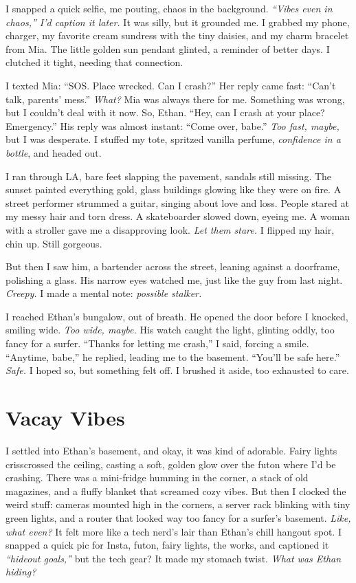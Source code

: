 \documentclass[12pt]{article}
\begin{document}
I snapped a quick selfie, me pouting, chaos in the background. \textit{“Vibes even in chaos,” I’d caption it later.} It was silly, but it grounded me. I grabbed my phone, charger, my favorite cream sundress with the tiny daisies, and my charm bracelet from \textnormal{Mia}. The little golden sun pendant glinted, a reminder of better days. I clutched it tight, needing that connection.

I texted \textnormal{Mia}: “SOS. Place wrecked. Can I crash?” Her reply came fast: “Can’t talk, parents’ mess.” \textit{What?} \textnormal{Mia} was always there for me. Something was wrong, but I couldn’t deal with it now. So, \textnormal{Ethan}. “Hey, can I crash at your place? Emergency.” His reply was almost instant: “Come over, babe.” \textit{Too fast, maybe,} but I was desperate. I stuffed my tote, spritzed vanilla perfume, \textit{confidence in a bottle}, and headed out.

I ran through LA, bare feet slapping the pavement, sandals still missing. The sunset painted everything gold, glass buildings glowing like they were on fire. A street performer strummed a guitar, singing about love and loss. People stared at my messy hair and torn dress. A skateboarder slowed down, eyeing me. A woman with a stroller gave me a disapproving look. \textit{Let them stare.} I flipped my hair, chin up. Still gorgeous.

But then I saw him, a bartender across the street, leaning against a doorframe, polishing a glass. His narrow eyes watched me, just like the guy from last night. \textit{Creepy.} I made a mental note: \textit{possible stalker.}

I reached \textnormal{Ethan}’s bungalow, out of breath. He opened the door before I knocked, smiling wide. \textit{Too wide, maybe.} His watch caught the light, glinting oddly, too fancy for a surfer. “Thanks for letting me crash,” I said, forcing a smile. “Anytime, babe,” he replied, leading me to the basement. “You’ll be safe here.” \textit{Safe.} I hoped so, but something felt off. I brushed it aside, too exhausted to care.

\section{Vacay Vibes}

I settled into \textnormal{Ethan}’s basement, and okay, it was kind of adorable. Fairy lights crisscrossed the ceiling, casting a soft, golden glow over the futon where I’d be crashing. There was a mini-fridge humming in the corner, a stack of old magazines, and a fluffy blanket that screamed cozy vibes. But then I clocked the weird stuff: cameras mounted high in the corners, a server rack blinking with tiny green lights, and a router that looked way too fancy for a surfer’s basement. \textit{Like, what even?} It felt more like a tech nerd’s lair than \textnormal{Ethan}’s chill hangout spot. I snapped a quick pic for Insta, futon, fairy lights, the works, and captioned it \textit{“hideout goals,”} but the tech gear? It made my stomach twist. \textit{What was \textnormal{Ethan} hiding?}
\end{document}
